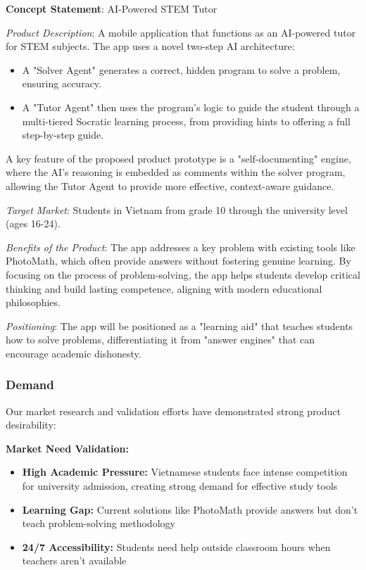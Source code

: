 \begin{mdframed}[linewidth=1pt,linecolor=black,backgroundcolor=white]
\textbf{Concept Statement}: AI-Powered STEM Tutor

\textit{Product Description}: A mobile application that functions as an AI-powered tutor for STEM subjects. The app uses
a novel two-step AI architecture:
\begin{itemize}
\item A "Solver Agent" generates a correct, hidden program to solve a problem, ensuring accuracy.
\item A "Tutor Agent" then uses the program's logic to guide the student through a multi-tiered Socratic learning process,
from providing hints to offering a full step-by-step guide.
\end{itemize}

A key feature of the proposed product prototype is a "self-documenting" engine, where the AI's reasoning is embedded as
comments within the solver program, allowing the Tutor Agent to provide more effective, context-aware guidance.

\textit{Target Market}: Students in Vietnam from grade 10 through the university level (ages 16-24).

\textit{Benefits of the Product}: The app addresses a key problem with existing tools like PhotoMath, which often provide
answers without fostering genuine learning. By focusing on the process of problem-solving, the app helps students develop
critical thinking and build lasting competence, aligning with modern educational philosophies.

\textit{Positioning}: The app will be positioned as a "learning aid" that teaches students how to solve problems,
differentiating it from "answer engines" that can encourage academic dishonesty.
\end{mdframed}

\subsubsection{Demand}
Our market research and validation efforts have demonstrated strong product desirability:

\textbf{Market Need Validation:}
\begin{itemize}
    \item \textbf{High Academic Pressure:} Vietnamese students face intense competition for university admission, creating strong demand for effective study tools
    \item \textbf{Learning Gap:} Current solutions like PhotoMath provide answers but don't teach problem-solving methodology
    \item \textbf{24/7 Accessibility:} Students need help outside classroom hours when teachers aren't available
\end{itemize}

